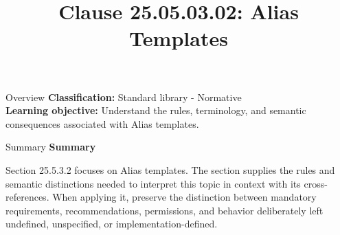 \documentclass[10pt,letterpaper]{article}
\title{Clause 25.05.03.02: Alias Templates}
\author{}
\date{}
\begin{document}
\maketitle
\begin{CornellOverviewBox}{Overview}
\textbf{Classification:} Standard library - Normative\\[2pt]
\textbf{Learning objective:} Understand the rules, terminology, and semantic consequences associated with Alias templates.
\end{CornellOverviewBox}\begin{CornellSummaryBox}{Summary}
{\sffamily\bfseries\color{Accent} Summary}\par\vspace{3pt}Section 25.5.3.2 focuses on Alias templates. The section supplies the rules and semantic distinctions needed to interpret this topic in context with its cross-references. When applying it, preserve the distinction between mandatory requirements, recommendations, permissions, and behavior deliberately left undefined, unspecified, or implementation-defined.
\end{CornellSummaryBox}
\end{document}
